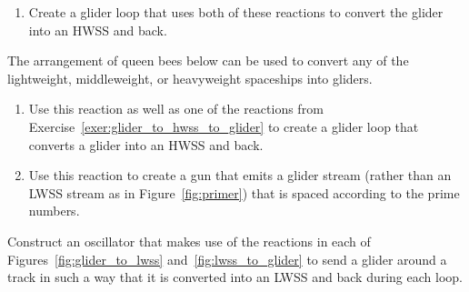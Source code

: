 \begin{multicols}{2}
\begin{problem}
\begin{enumerate}[label=\bf\color{ocre}(\alph*)]
			\item Create a glider loop that uses both of these reactions to convert the glider into an HWSS and back.
		\end{enumerate}
	\end{problem}
	
	
	\mfilbreak
	
	
	\begin{problem}\label{exer:any_wss_to_glider}
		The arrangement of queen bees below can be used to convert any of the lightweight, middleweight, or heavyweight spaceships into gliders.
		\begin{center}
		\end{center}
		\begin{enumerate}[label=\bf\color{ocre}(\alph*)]
			\item Use this reaction as well as one of the reactions from Exercise~\ref{exer:glider_to_hwss_to_glider} to create a glider loop that converts a glider into an HWSS and back.
			
			\item Use this reaction to create a gun that emits a glider stream (rather than an LWSS stream as in Figure~\ref{fig:primer}) that is spaced according to the prime numbers.
		\end{enumerate}
	\end{problem}
	
	
	\mfilbreak
	
	
	\begin{problem}\label{exer:glider_to_lwss_loop}
		Construct an oscillator that makes use of the reactions in each of Figures~\ref{fig:glider_to_lwss} and~\ref{fig:lwss_to_glider} to send a glider around a track in such a way that it is converted into an LWSS and back during each loop.
	\end{problem}
	

\end{multicols}
